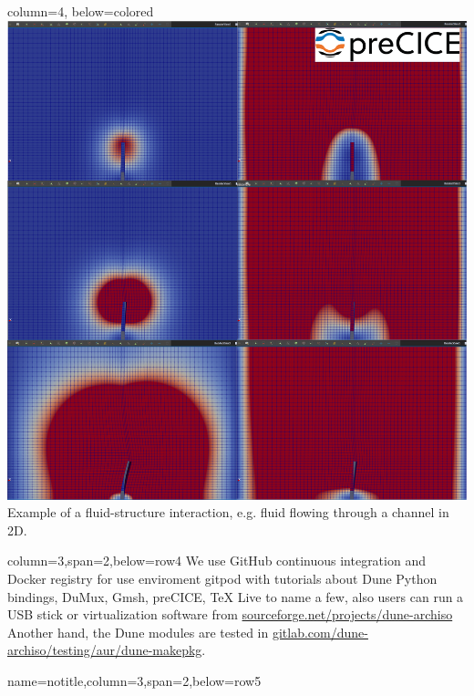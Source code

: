 \documentclass[
	paper=a0,
	style=ruled, %
	]{bfhsciposter}
\begin{document}
\begin{tcbposter}[
		poster={
				columns=4,
				rows=7,
				spacing=1cm,
			},]
	\begin{posterboxenv}{column=4, below=colored}
		\includegraphics[width=\linewidth]{sequence}
		Example of a fluid-structure interaction, e.g. fluid flowing through a channel in 2D.
	\end{posterboxenv}

	\begin{posterboxenv}[BFH-framed,title=GitHub's Docker registry
		\\
		\url{https://github.com/orgs/cpp-review-dune/packages}]{column=3,span=2,below=row4}
		We use GitHub continuous integration and Docker registry for use enviroment gitpod with  tutorials about Dune Python bindings, DuMux,  Gmsh, preCICE, TeX Live to name a few, also users can run a USB stick or virtualization software
		from \url{sourceforge.net/projects/dune-archiso}
		Another hand, the Dune modules are tested in \url{gitlab.com/dune-archiso/testing/aur/dune-makepkg}. 
	\end{posterboxenv}

	\begin{posterboxenv}{name=notitle,column=3,span=2,below=row5}
		\nocite{*}
		
	\end{posterboxenv}

\end{tcbposter}
\end{document}
